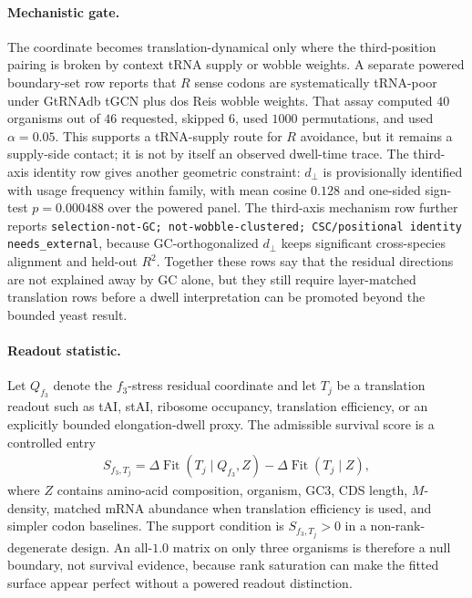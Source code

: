 \paragraph{Mechanistic gate.}
The coordinate becomes translation-dynamical only where the third-position pairing is broken by context tRNA supply or wobble weights.  A separate powered boundary-set row reports that $R$ sense codons are systematically tRNA-poor under GtRNAdb tGCN plus dos Reis wobble weights.  That assay computed $40$ organisms out of $46$ requested, skipped $6$, used $1000$ permutations, and used $\alpha=0.05$.  This supports a tRNA-supply route for $R$ avoidance, but it remains a supply-side contact; it is not by itself an observed dwell-time trace.  The third-axis identity row gives another geometric constraint: $d_{\perp}$ is provisionally identified with usage frequency within family, with mean cosine $0.128$ and one-sided sign-test $p=0.000488$ over the powered panel.  The third-axis mechanism row further reports \texttt{selection-not-GC; not-wobble-clustered; CSC/positional identity needs\_external}, because GC-orthogonalized $d_{\perp}$ keeps significant cross-species alignment and held-out $R^2$.  Together these rows say that the residual directions are not explained away by GC alone, but they still require layer-matched translation rows before a dwell interpretation can be promoted beyond the bounded yeast result.

\paragraph{Readout statistic.}
Let $Q_{f_3}$ denote the $f_3$-stress residual coordinate and let $T_j$ be a translation readout such as tAI, stAI, ribosome occupancy, translation efficiency, or an explicitly bounded elongation-dwell proxy.  The admissible survival score is a controlled entry
$$
\begin{aligned}
S_{f_3,T_j}=\Delta \operatorname{Fit}(T_j\mid Q_{f_3},Z)-\Delta \operatorname{Fit}(T_j\mid Z),
\end{aligned}
$$
where $Z$ contains amino-acid composition, organism, GC3, CDS length, $M$-density, matched mRNA abundance when translation efficiency is used, and simpler codon baselines.  The support condition is $S_{f_3,T_j}>0$ in a non-rank-degenerate design.  An all-$1.0$ matrix on only three organisms is therefore a null boundary, not survival evidence, because rank saturation can make the fitted surface appear perfect without a powered readout distinction.

